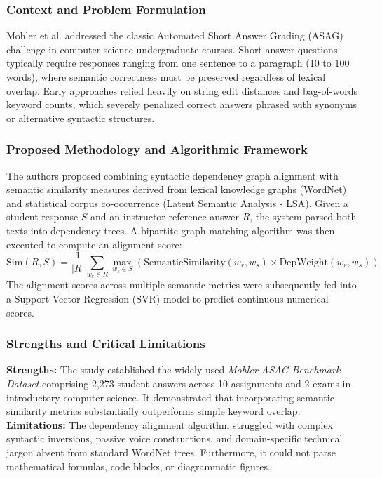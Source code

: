 \subsubsection{Context and Problem Formulation}
Mohler et al. addressed the classic Automated Short Answer Grading (ASAG) challenge in computer science undergraduate courses. Short answer questions typically require responses ranging from one sentence to a paragraph (10 to 100 words), where semantic correctness must be preserved regardless of lexical overlap. Early approaches relied heavily on string edit distances and bag-of-words keyword counts, which severely penalized correct answers phrased with synonyms or alternative syntactic structures.

\subsubsection{Proposed Methodology and Algorithmic Framework}
The authors proposed combining syntactic dependency graph alignment with semantic similarity measures derived from lexical knowledge graphs (WordNet) and statistical corpus co-occurrence (Latent Semantic Analysis - LSA). Given a student response $S$ and an instructor reference answer $R$, the system parsed both texts into dependency trees. A bipartite graph matching algorithm was then executed to compute an alignment score:
\begin{equation}
    \text{Sim}(R, S) = \frac{1}{|R|} \sum_{w_r \in R} \max_{w_s \in S} \left( \text{SemanticSimilarity}(w_r, w_s) \times \text{DepWeight}(w_r, w_s) \right)
\end{equation}
The alignment scores across multiple semantic metrics were subsequently fed into a Support Vector Regression (SVR) model to predict continuous numerical scores.

\subsubsection{Strengths and Critical Limitations}
\textbf{Strengths:} The study established the widely used \textit{Mohler ASAG Benchmark Dataset} comprising 2,273 student answers across 10 assignments and 2 exams in introductory computer science. It demonstrated that incorporating semantic similarity metrics substantially outperforms simple keyword overlap. \\
\textbf{Limitations:} The dependency alignment algorithm struggled with complex syntactic inversions, passive voice constructions, and domain-specific technical jargon absent from standard WordNet trees. Furthermore, it could not parse mathematical formulas, code blocks, or diagrammatic figures.

